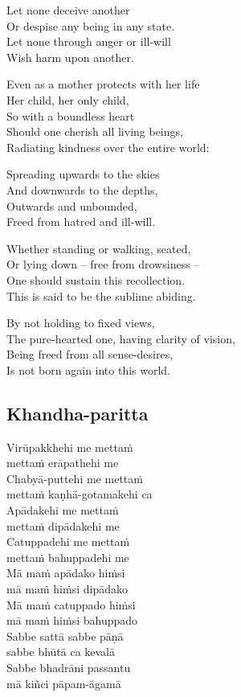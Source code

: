 Let none deceive another\\
Or despise any being in any state.\\
Let none through anger or ill-will\\
Wish harm upon another.

Even as a mother protects with her life\\
Her child, her only child,\\
So with a boundless heart\\
Should one cherish all living beings,\\
Radiating kindness over the entire world:

Spreading upwards to the skies\\
And downwards to the depths,\\
Outwards and unbounded,\\
Freed from hatred and ill-will.

Whether standing or walking, seated, \\
Or lying down -- free from drowsiness --\\
One should sustain this recollection.\\
This is said to be the sublime abiding.

By not holding to fixed views,\\
The pure-hearted one, having clarity of vision,\\
Being freed from all sense-desires,\\
Is not born again into this world.


\subsection{Khandha-paritta}
\label{virupakkhehi}


Virūpakkhehi me mettaṁ\\\vin mettaṁ erāpathehi me\\
Chabyā-puttehi me mettaṁ\\\vin mettaṁ kaṇhā-gotamakehi ca\\
Apādakehi me mettaṁ\\\vin mettaṁ dipādakehi me\\
Catuppadehi me mettaṁ\\\vin mettaṁ bahuppadehi me\\
Mā maṁ apādako hiṁsi\\\vin mā maṁ hiṁsi dipādako\\
Mā maṁ catuppado hiṁsi\\\vin mā maṁ hiṁsi bahuppado\\
Sabbe sattā sabbe pāṇā\\\vin sabbe bhūtā ca kevalā\\
Sabbe bhadrāni passantu\\\vin mā kiñci pāpam-āgamā

